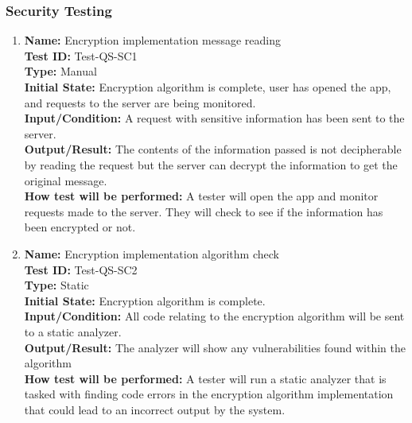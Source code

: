 \documentclass[12pt, titlepage]{article}
\begin{document}
\subsubsection{Security Testing}

\begin{enumerate}

  \item
        \textbf{Name:} Encryption implementation message reading \label{itm:Test-QS-SC1} \\
        \textbf{Test ID:} Test-QS-SC1 \\
        \textbf{Type:} Manual \\
        \textbf{Initial State:} Encryption algorithm is complete, user has opened the app, and requests to the server are being monitored. \\
        \textbf{Input/Condition:} A request with sensitive information has been sent to the server. \\
        \textbf{Output/Result:} The contents of the information passed is not decipherable by reading the request but the server can decrypt the information to get the original message. \\
        \textbf{How test will be performed:} A tester will open the app and monitor requests made to the server. They will check to see if the information has been encrypted or not.

  \item
        \textbf{Name:} Encryption implementation algorithm check \label{itm:Test-QS-SC2} \\
        \textbf{Test ID:} Test-QS-SC2 \\
        \textbf{Type:} Static \\
        \textbf{Initial State:} Encryption algorithm is complete. \\
        \textbf{Input/Condition:} All code relating to the encryption algorithm will be sent to a static analyzer. \\
        \textbf{Output/Result:} The analyzer will show any vulnerabilities found within the algorithm \\
        \textbf{How test will be performed:} A tester will run a static analyzer that is tasked with finding code errors in the encryption algorithm implementation that could lead to an incorrect output by the system.


\end{enumerate}
\end{document}
